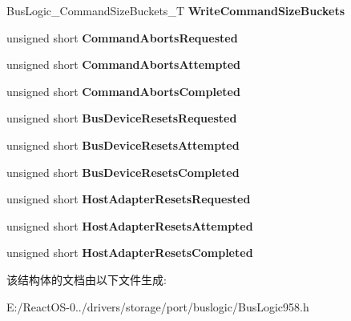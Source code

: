\begin{DoxyCompactItemize}
\item 
\mbox{\label{struct_bus_logic___target_statistics_aaf9d885b9e28a170c5503432660493a6}} 
Bus\+Logic\+\_\+\+Command\+Size\+Buckets\+\_\+T {\bfseries Write\+Command\+Size\+Buckets}
\item 
\mbox{\label{struct_bus_logic___target_statistics_a8716a78fb2ce615db5d46fcb149e8154}} 
unsigned short {\bfseries Command\+Aborts\+Requested}
\item 
\mbox{\label{struct_bus_logic___target_statistics_ad9fbfeb0c4ef56e2fe23db6edf7135a2}} 
unsigned short {\bfseries Command\+Aborts\+Attempted}
\item 
\mbox{\label{struct_bus_logic___target_statistics_a50571a5bd4ec0586a309884658cc0874}} 
unsigned short {\bfseries Command\+Aborts\+Completed}
\item 
\mbox{\label{struct_bus_logic___target_statistics_acdb1508bdd85e78555c125bc23dcb0d9}} 
unsigned short {\bfseries Bus\+Device\+Resets\+Requested}
\item 
\mbox{\label{struct_bus_logic___target_statistics_a62508f2edaa45dbbef54a9d80e9edb8c}} 
unsigned short {\bfseries Bus\+Device\+Resets\+Attempted}
\item 
\mbox{\label{struct_bus_logic___target_statistics_ac94fb29e641cc880a3b48304390f2198}} 
unsigned short {\bfseries Bus\+Device\+Resets\+Completed}
\item 
\mbox{\label{struct_bus_logic___target_statistics_a4b0541361af9b51ddfce0bc2976631ac}} 
unsigned short {\bfseries Host\+Adapter\+Resets\+Requested}
\item 
\mbox{\label{struct_bus_logic___target_statistics_aa243e37bf41d4f6b2cad661b9550c8c0}} 
unsigned short {\bfseries Host\+Adapter\+Resets\+Attempted}
\item 
\mbox{\label{struct_bus_logic___target_statistics_ae551fe539b1f50623f6445b524bb796e}} 
unsigned short {\bfseries Host\+Adapter\+Resets\+Completed}
\end{DoxyCompactItemize}


该结构体的文档由以下文件生成\+:\begin{DoxyCompactItemize}
\item 
E\+:/\+React\+O\+S-\/0../drivers/storage/port/buslogic/Bus\+Logic958.\+h\end{DoxyCompactItemize}
